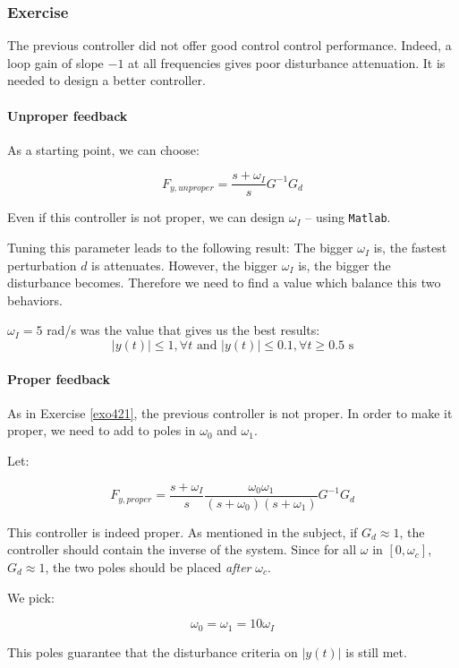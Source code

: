 \subsubsection{Exercise}

The previous controller did not offer good control control performance.
Indeed, a loop gain of slope $-1$ at all frequencies gives poor disturbance attenuation. 
It is needed to design a better controller.

\paragraph{Unproper feedback}

As a starting point, we can choose:

$$ F_{y,unproper} = \frac{s + \omega_I}{s} G^{-1} G_d $$

Even if this controller is not proper, we can design $\omega_I$ -- using \texttt{Matlab}. 

Tuning this parameter leads to the following result:
The bigger $\omega_I$ is, the fastest perturbation $d$ is attenuates. 
However, the bigger $\omega_I$ is, the bigger the disturbance becomes.
Therefore we need to find a value which balance this two behaviors.

$\omega_I = 5$ rad/s was the value that gives us the best results: 
        $$|y(t)| \leq 1, \forall t \text{ and } |y(t)| \leq 0.1, \forall t \geq 0.5\text{ s}$$ 

\paragraph{Proper feedback}

As in Exercise \ref{exo421}, the previous controller is not proper.
In order to make it proper, we need to add to poles in $\omega_0$ and $\omega_1$.

Let:

$$ F_{y,proper} = \frac{s + \omega_I}{s} \frac{\omega_0 \omega_1}{(s+ \omega_0)(s + \omega_1)} G^{-1} G_d$$ 

This controller is indeed proper.
As mentioned in the subject, if $G_d \approx 1$, the controller should contain the inverse of the system. 
Since for all $\omega$ in $[0,\omega_c]$, $ G_d \approx 1$, the two poles should be placed \emph{after} $\omega_c$.

We pick:

$$\omega_0 = \omega_1 = 10\omega_I$$

This poles guarantee that the disturbance criteria on $|y(t)|$ is still met.

